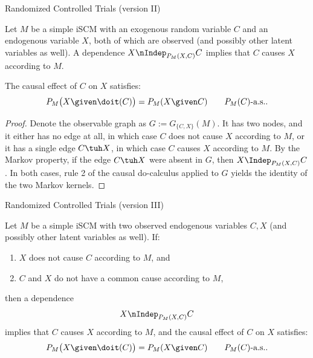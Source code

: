 \begin{frame}{Randomized Controlled Trials (version II)}
\begin{Prp}[\ref{prp:RCT2}]
Let $M$ be a simple iSCM with an exogenous random variable $C$ and an endogenous 
variable $X$, both of which are observed (and possibly other latent variables as well).
A dependence 
  $X \nIndep_{P_{M}(X,C)} C $
implies that $C$ causes $X$ according to $M$.

The causal effect of $C$ on $X$ satisfies:
  $$P_{M}\big(X \given \doit(C)\big) = P_{M}(X \given C) \qquad P_{M}(C)\text{-a.s.}.$$
\end{Prp}
\begin{proof}
Denote the observable graph as $G := G_{\{C,X\}}(M)$.
It has two nodes, and it either has no edge at all, in which case $C$ does not cause $X$ according to
$M$, or it has a single edge $C \tuh X$, in which case $C$ causes $X$ according to $M$.
By the Markov property, if the edge $C \tuh X$ were absent in $G$, 
then $X \Indep_{P_{M}(X,C)} C$. 
In both cases, rule 2 of the causal do-calculus applied to $G$ yields the identity of the two Markov kernels. 
\end{proof}
\end{frame}

\begin{frame}{Randomized Controlled Trials (version III)}
\begin{Prp}[\ref{prp:RCT3}]
Let $M$ be a simple iSCM with two observed endogenous variables $C, X$
(and possibly other latent variables as well). If:
  \begin{enumerate}
    \item $X$ does not cause $C$ according to $M$, and
    \item $C$ and $X$ do not have a common cause according to $M$,
  \end{enumerate}
then a dependence 
  $$X \nIndep_{P_{M}(X,C)} C$$
  implies that $C$ causes $X$ according to $M$, and the causal effect of $C$ on $X$ satisfies:
  $$P_{M}\big(X \given \doit(C)\big) = P_{M}(X \given C) \qquad P_{M}(C)\text{-a.s.}.$$
\end{Prp}
\end{frame}

